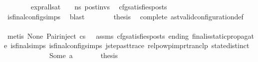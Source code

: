 \begin{isabellebody}
\ \ \ \ \ \ \isamarkupfalse%
\ {\isachardoublequoteopen}{\isacharparenleft}{\kern0pt}expr{\isacharunderscore}{\kern0pt}all{\isacharunderscore}{\kern0pt}sat\ {\isasymLambda}\ {\isasymGamma}\ {\isasymOmega}\ ns{}{\isacharparenright}{\kern0pt}\ post{\isacharunderscore}{\kern0pt}invs{\isachardoublequoteclose}\ \isamarkupfalse%
\ cfg{\isacharunderscore}{\kern0pt}satisfies{\isacharunderscore}{\kern0pt}posts\ \isanewline
\ \ \ \ \ \ \ \ \isamarkupfalse%
\ is{\isacharunderscore}{\kern0pt}final{\isacharunderscore}{\kern0pt}config{\isachardot}{\kern0pt}simps{\isacharparenleft}{\kern0pt}{}{\isacharparenright}{\kern0pt}\ \isamarkupfalse%
\ blast\isanewline
\ \ \ \ \ \ \isamarkupfalse%
\ {\isacharquery}{\kern0pt}thesis\ \isamarkupfalse%
\ complete\ ast{\isacharunderscore}{\kern0pt}valid{\isacharunderscore}{\kern0pt}configuration{\isacharunderscore}{\kern0pt}def\isanewline
\ \ \ \ \ \ \ \ \isamarkupfalse%
\ {\isacharparenleft}{\kern0pt}metis\ None\ Pair{\isacharunderscore}{\kern0pt}inject\ {\isacartoucheopen}cs{}\ {\isacharequal}{\kern0pt}\ {\isacharbrackleft}{\kern0pt}{\isacharbrackright}{\kern0pt}{\isacartoucheclose}\ assms{\isacharparenleft}{\kern0pt}{}{\isacharparenright}{\kern0pt}\ cfg{\isacharunderscore}{\kern0pt}satisfies{\isacharunderscore}{\kern0pt}posts\ ending\ final{\isacharunderscore}{\kern0pt}is{\isacharunderscore}{\kern0pt}static{\isacharunderscore}{\kern0pt}propagate\ is{\isacharunderscore}{\kern0pt}final{\isachardot}{\kern0pt}simps{\isacharparenleft}{\kern0pt}{}{\isacharparenright}{\kern0pt}\ is{\isacharunderscore}{\kern0pt}final{\isacharunderscore}{\kern0pt}config{\isachardot}{\kern0pt}simps{\isacharparenleft}{\kern0pt}{}{\isacharparenright}{\kern0pt}\ j{\isacharunderscore}{\kern0pt}step{\isacharunderscore}{\kern0pt}ast{\isacharunderscore}{\kern0pt}trace\ relpowp{\isacharunderscore}{\kern0pt}imp{\isacharunderscore}{\kern0pt}rtranclp\ state{\isachardot}{\kern0pt}distinct{\isacharparenleft}{\kern0pt}{}{\isacharparenright}{\kern0pt}{\isacharparenright}{\kern0pt}\isanewline
\ \ \ \ \isamarkupfalse%
\isanewline
\ \ \isamarkupfalse%
\isanewline
\ \ \ \ \isamarkupfalse%
\ {\isacharparenleft}{\kern0pt}Some\ a{\isacharparenright}{\kern0pt}\isanewline
\ \ \ \ \isamarkupfalse%
\ \isamarkupfalse%
\ {\isacharquery}{\kern0pt}thesis\isanewline

\end{isabellebody}
